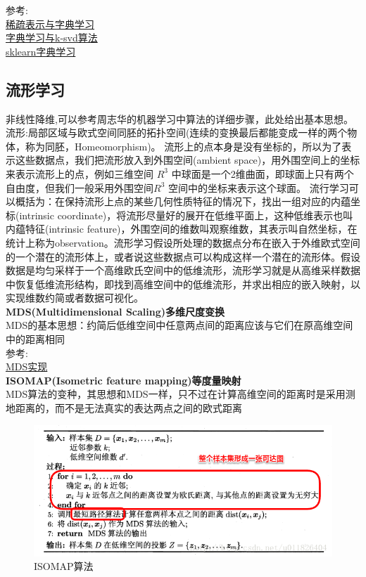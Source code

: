 \documentclass{article}
\begin{document}
参考:\\
\href{https://blog.csdn.net/baidu_38060633/article/details/70338345}{稀疏表示与字典学习}\\
\href{https://blog.csdn.net/hjimce/article/details/50810129}{字典学习与k-svd算法}\\
\href{https://scikit-learn.org/stable/modules/decomposition.html#dictionary-learning}{sklearn字典学习}
\subsection{流形学习}
非线性降维,可以参考周志华的机器学习中算法的详细步骤，此处给出基本思想。\\
流形:局部区域与欧式空间同胚的拓扑空间(连续的变换最后都能变成一样的两个物体，称为同胚，Homeomorphism)。
流形上的点本身是没有坐标的，所以为了表示这些数据点，我们把流形放入到外围空间(ambient space)，用外围空间上的坐标来表示流形上的点，例如三维空间 $R^3$ 中球面是一个2维曲面，即球面上只有两个自由度，但我们一般采用外围空间$R^3$ 空间中的坐标来表示这个球面。
流行学习可以概括为：在保持流形上点的某些几何性质特征的情况下，找出一组对应的内蕴坐标(intrinsic coordinate)，将流形尽量好的展开在低维平面上，这种低维表示也叫内蕴特征(intrinsic feature)，外围空间的维数叫观察维数，其表示叫自然坐标，在统计上称为observation。流形学习假设所处理的数据点分布在嵌入于外维欧式空间的一个潜在的流形体上，或者说这些数据点可以构成这样一个潜在的流形体。假设数据是均匀采样于一个高维欧氏空间中的低维流形，流形学习就是从高维采样数据中恢复低维流形结构，即找到高维空间中的低维流形，并求出相应的嵌入映射，以实现维数约简或者数据可视化。\\
\textbf{ MDS(Multidimensional Scaling)多维尺度变换}\\
MDS的基本思想：约简后低维空间中任意两点间的距离应该与它们在原高维空间中的距离相同\\
参考:\\
\href{http://www.cnblogs.com/tanjuntao/p/8067748.html}{MDS实现}\\
\textbf{ISOMAP(Isometric feature mapping)等度量映射}\\
MDS算法的变种，其思想和MDS一样，只不过在计算高维空间的距离时是采用测地距离的，而不是无法真实的表达两点之间的欧式距离\\
\begin{figure}[h]
\centering
\includegraphics[height=0.4\linewidth]{11.png}
\caption{ISOMAP算法}
\end{figure}\\
\end{document}
